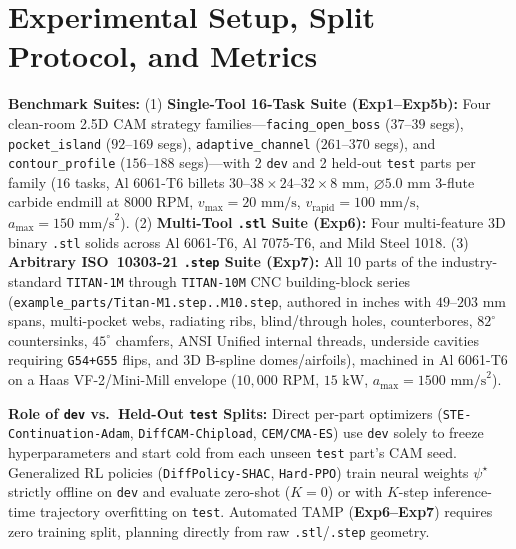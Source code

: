 \documentclass[conference]{IEEEtran}
\begin{document}
\section{Experimental Setup, Split Protocol, and Metrics}
\label{sec:setup}

\textbf{Benchmark Suites:}
(1) \textbf{Single-Tool 16-Task Suite (\textbf{Exp1--Exp5b}):} Four clean-room 2.5D CAM strategy families—\texttt{facing\_open\_boss} ($37$--$39$ segs), \texttt{pocket\_island} ($92$--$169$ segs), \texttt{adaptive\_channel} ($261$--$370$ segs), and \texttt{contour\_profile} ($156$--$188$ segs)—with 2 \texttt{dev} and 2 held-out \texttt{test} parts per family ($16$ tasks, Al 6061-T6 billets $30\text{--}38 \times 24\text{--}32 \times 8\text{ mm}$, $\varnothing 5.0\text{ mm}$ 3-flute carbide endmill at $8000\text{ RPM}$, $v_{\max} = 20\text{ mm/s}$, $v_{\text{rapid}} = 100\text{ mm/s}$, $a_{\max} = 150\text{ mm/s}^2$).
(2) \textbf{Multi-Tool \texttt{.stl} Suite (\textbf{Exp6}):} Four multi-feature 3D binary \texttt{.stl} solids across Al 6061-T6, Al 7075-T6, and Mild Steel 1018.
(3) \textbf{Arbitrary ISO~10303-21 \texttt{.step} Suite (\textbf{Exp7}):} All 10 parts of the industry-standard \texttt{TITAN-1M} through \texttt{TITAN-10M} CNC building-block series (\texttt{example\_parts/Titan-M1.step..M10.step}, authored in inches with $49\text{--}203\text{ mm}$ spans, multi-pocket webs, radiating ribs, blind/through holes, counterbores, $82^\circ$ countersinks, $45^\circ$ chamfers, ANSI Unified internal threads, underside cavities requiring \texttt{G54+G55} flips, and 3D B-spline domes/airfoils), machined in Al 6061-T6 on a Haas VF-2/Mini-Mill envelope ($10{,}000\text{ RPM}$, $15\text{ kW}$, $a_{\max} = 1500\text{ mm/s}^2$).

\textbf{Role of \texttt{dev} vs.\ Held-Out \texttt{test} Splits:}
Direct per-part optimizers (\texttt{STE-Continuation-Adam}, \texttt{DiffCAM-Chipload}, \texttt{CEM/CMA-ES}) use \texttt{dev} solely to freeze hyperparameters and start cold from each unseen \texttt{test} part's CAM seed. Generalized RL policies (\texttt{DiffPolicy-SHAC}, \texttt{Hard-PPO}) train neural weights $\psi^\star$ strictly offline on \texttt{dev} and evaluate zero-shot ($K=0$) or with $K$-step inference-time trajectory overfitting on \texttt{test}. Automated TAMP (\textbf{Exp6--Exp7}) requires zero training split, planning directly from raw \texttt{.stl}/\texttt{.step} geometry.
\end{document}

